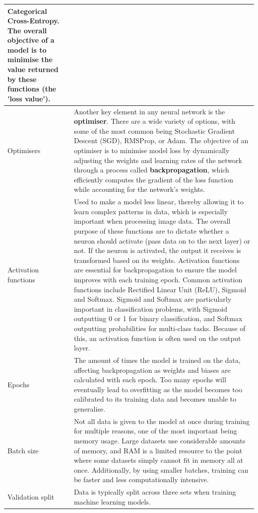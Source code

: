 \documentclass[12pt]{report}
\begin{document}
\begin{longtable}{ | p{} | p{} | }
    Categorical Cross-Entropy. The overall objective of a model is to minimise the value returned by these functions (the 'loss value').  \\
    \hline 
    Optimisers & Another key element in any neural network is the \textbf{optimiser}. There are a wide variety of options,
    with some of the most common being Stochastic Gradient Descent (SGD), RMSProp, or Adam. The objective of an optimiser 
    is to minimise model loss by dynamically adjusting the weights and learning rates of the network through a process called 
    \textbf{backpropagation}, which efficiently computes the gradient of the loss function while accounting for the 
    network's weights. \\
    \hline 
    Activation functions & Used to make a model 
    less linear, thereby allowing it to learn complex patterns in data, which is especially important when processing image data.
    The overall purpose of these functions are to dictate whether a neuron should activate (pass data on to the next layer) or not.
    If the neuron is activated, the output it receives is transformed based on its weights. Activation functions are essential 
    for backpropagation to ensure the model improves with each training epoch. Common activation functions include Rectified Linear 
    Unit (ReLU), Sigmoid and Softmax. Sigmoid and Softmax are particularly important in classification problems, with Sigmoid 
    outputting 0 or 1 for binary classification, and Softmax outputting probabilities for multi-class tasks. Because of this, an activation 
    function is often used on the output layer.   \\
    \hline 
    Epochs & The amount of times the model is trained on the data, affecting backpropagation as 
    weights and biases are calculated with each epoch. Too many epochs will eventually lead to 
    overfitting as the model becomes too calibrated to its training data and becomes unable 
    to generalise. \\
    \hline 
    Batch size & Not all data is given to the model at once during training for multiple reasons,
    one of the most important being memory usage. Large datasets use considerable amounts of memory,
    and RAM is a limited resource to the point where some datasets simply cannot fit in memory all 
    at once. Additionally, by using smaller batches, training can be faster and less computationally 
    intensive. \\
    \hline 
    Validation split & Data is typically split across three sets when training machine learning models.

\end{longtable}
\end{document}
